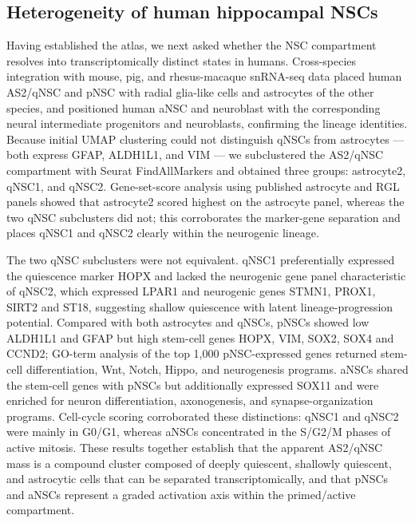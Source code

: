 \documentclass[11pt]{article}
\begin{document}
\subsection{Heterogeneity of human hippocampal NSCs}

Having established the atlas, we next asked whether the NSC compartment
resolves into transcriptomically distinct states in humans. Cross-species
integration with mouse, pig, and rhesus-macaque snRNA-seq data placed human
AS2/qNSC and pNSC with radial glia-like cells and astrocytes of the other
species, and positioned human aNSC and neuroblast with the corresponding
neural intermediate progenitors and neuroblasts, confirming the lineage
identities. Because initial UMAP clustering could not distinguish qNSCs
from astrocytes --- both express GFAP, ALDH1L1, and VIM
\cite{zamanian2012genomic,liddelow2017neurotoxic} --- we subclustered the
AS2/qNSC compartment with Seurat FindAllMarkers and obtained three groups:
astrocyte2, qNSC1, and qNSC2. Gene-set-score analysis using published
astrocyte and RGL panels \cite{clarke2018normal,hochgerner2018conserved}
showed that astrocyte2 scored highest on the astrocyte panel, whereas the
two qNSC subclusters did not; this corroborates the marker-gene separation
and places qNSC1 and qNSC2 clearly within the neurogenic lineage.

The two qNSC subclusters were not equivalent. qNSC1 preferentially expressed
the quiescence marker HOPX and lacked the neurogenic gene panel
characteristic of qNSC2, which expressed LPAR1 and neurogenic genes STMN1,
PROX1, SIRT2 and ST18, suggesting shallow quiescence with latent
lineage-progression potential. Compared with both astrocytes and qNSCs,
pNSCs showed low ALDH1L1 and GFAP but high stem-cell genes HOPX, VIM,
SOX2, SOX4 and CCND2; GO-term analysis of the top 1{,}000 pNSC-expressed
genes returned stem-cell differentiation, Wnt, Notch, Hippo, and
neurogenesis programs. aNSCs shared the stem-cell genes with pNSCs but
additionally expressed SOX11 and were enriched for neuron differentiation,
axonogenesis, and synapse-organization programs. Cell-cycle scoring
corroborated these distinctions: qNSC1 and qNSC2 were mainly in G0/G1,
whereas aNSCs concentrated in the S/G2/M phases of active mitosis. These
results together establish that the apparent AS2/qNSC mass is a compound
cluster composed of deeply quiescent, shallowly quiescent, and astrocytic
cells that can be separated transcriptomically, and that pNSCs and aNSCs
represent a graded activation axis within the primed/active compartment.
\end{document}
